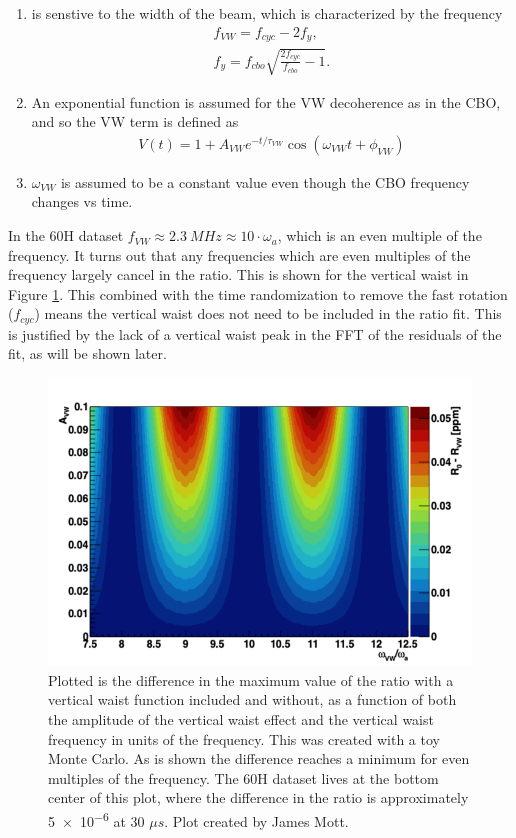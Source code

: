 	\begin{enumerate}
		\item{\wa is senstive to the width of the beam, which is characterized by the frequency 
			\begin{gather}
				f_{VW} = f_{cyc} - 2f_{y}, \\
				f_{y} = f_{cbo} \sqrt{\frac{2f_{cyc}}{f_{cbo}} - 1}.
			\end{gather}}
		\item{An exponential function is assumed for the VW decoherence as in the CBO, and so the VW term is defined as
			\begin{gather}
					V(t) = 1 + A_{VW} e^{-t/\tau_{VW}} \cos(\omega_{VW}t + \phi_{VW})
			\end{gather}
		}
		\item{$\omega_{VW}$ is assumed to be a constant value even though the CBO frequency changes vs time.}
	\end{enumerate}

	In the 60H dataset $f_{VW} \approx \SI{2.3}{MHz} \approx 10 \cdot \omega_{a}$, which is an even multiple of the \gmtwo frequency. It turns out that any frequencies which are even multiples of the \gmtwo frequency largely cancel in the ratio. This is shown for the vertical waist in Figure \ref{fig:VWPlot}. This combined with the time randomization to remove the fast rotation ($f_{cyc}$) means the vertical waist does not need to be included in the ratio fit. This is justified by the lack of a vertical waist peak in the FFT of the residuals of the fit, as will be shown later.

	\begin{figure}[]
		\centering
		\includegraphics[width=\textwidth]{VWPlot}
	    \caption[VWPlot]{Plotted is the difference in the maximum value of the ratio with a vertical waist function included and without, as a function of both the amplitude of the vertical waist effect and the vertical waist frequency in units of the \gmtwo frequency. This was created with a toy Monte Carlo. As is shown the difference reaches a minimum for even multiples of the \gmtwo frequency. The 60H dataset lives at the bottom center of this plot, where the difference in the ratio is approximately \SI{5e-6}{} at 30 $\mu s$. Plot created by James Mott.}
	    \label{fig:VWPlot}
	\end{figure}


